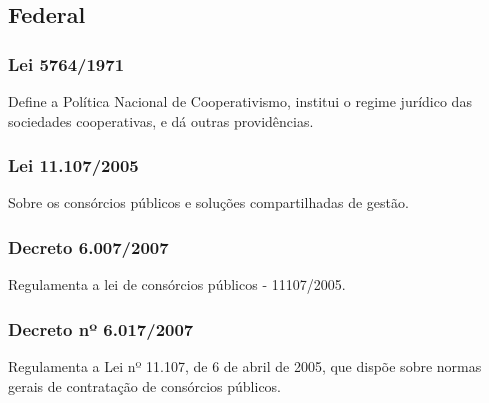 \begin{subapend}
	\subsection{Federal}
	\begin{subsubapend}
		\subsubsection{Lei 5764/1971}
		Define a Política Nacional de Cooperativismo, institui o regime jurídico das sociedades cooperativas, e dá outras providências.
		\subsubsection{Lei 11.107/2005}
		Sobre os consórcios públicos e soluções compartilhadas de gestão.
		\subsubsection{Decreto 6.007/2007}
		Regulamenta a lei de consórcios públicos - 11107/2005.
		\subsubsection{Decreto nº 6.017/2007}
		Regulamenta a Lei nº 11.107, de 6 de abril de 2005, que dispõe sobre normas gerais de contratação de consórcios públicos.
	\end{subsubapend}
\end{subapend}

